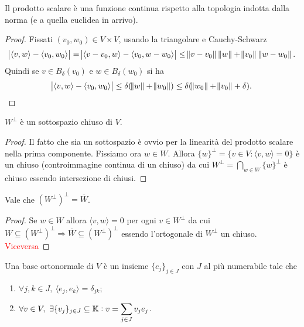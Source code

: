 \begin{lemma}
    Il prodotto scalare è una funzione continua rispetto alla topologia indotta dalla norma (e a quella euclidea in arrivo).
\end{lemma}
\begin{proof}
    Fissati $ (v_0, w_0) \in V \times V $, usando la triangolare e Cauchy-Schwarz
    \[
        \abs{{\langle v, w \rangle} - {\langle v_0, w_0 \rangle}} = \abs{{\langle v - v_0, w\rangle} - {\langle v_0, w - w_0 \rangle}} \leq \norm{v - v_0} \, \norm{w} + \norm{v_0} \, \norm{w - w_0}.
    \]
    Quindi se $ v \in B_\delta(v_0) $ e $ w \in B_\delta(w_0) $ si ha
    \[
        \abs{{\langle v, w \rangle} - {\langle v_0, w_0 \rangle}} \leq \delta(\norm{w} + \norm{w_0}) \leq \delta(\norm{w_0} + \norm{v_0} + \delta). \qedhere
    \]
\end{proof}

\begin{proposition}
    $ W^\perp $ è un sottospazio chiuso di $ V $.
\end{proposition}
\begin{proof}
    Il fatto che sia un sottospazio è ovvio per la linearità del prodotto scalare nella prima componente. Fissiamo ora $ w \in W $. Allora $ \{w\}^\perp = \{v \in V : {\langle v, w \rangle} = 0\} $ è un chiuso (controimmagine continua di un chiuso) da cui $ W^\perp = \bigcap_{w \in W} \{w\}^\perp $ è chiuso essendo intersezione di chiusi. 
\end{proof}

\begin{proposition}
    Vale che $ (W^\perp)^\perp = \overline{W} $.
\end{proposition}
\begin{proof}
    Se $ w \in W $ allora $ {\langle v, w \rangle} = 0 $ per ogni $ v \in W^\perp $ da cui $ W \subseteq (W^\perp)^\perp \Rightarrow \overline{W} \subseteq (W^\perp)^\perp $ essendo l'ortogonale di $ W^\perp $ un chiuso. \textcolor{red}{Viceversa}
\end{proof}

\begin{definition}
    Una base ortonormale di $ V $ è un insieme $ \{e_j\}_{j \in J} $ con $ J $ al più numerabile tale che
    \begin{enumerate}[label=(\roman*)]
        \item $ \forall j, k \in J, \ {\langle e_j, e_k \rangle} = \delta_{jk} $;
        \item\label{def:coin:base} $ \forall v \in V, \ \exists \{v_j\}_{j \in J} \subseteq \mathbb{K} : v = \displaystyle{\sum_{j \in J} v_j e_j} $. 
    \end{enumerate}
\end{definition} 

